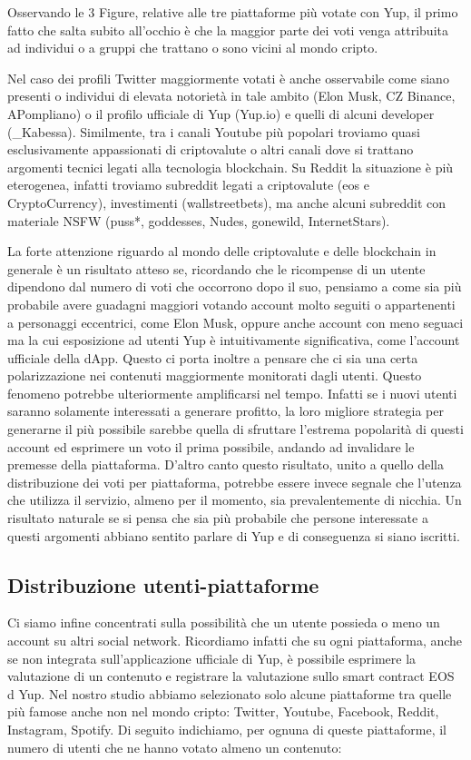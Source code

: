 Osservando le 3 Figure, relative alle tre piattaforme più votate con Yup, il primo fatto che salta subito all'occhio è che la maggior parte dei voti venga attribuita ad individui o a gruppi che trattano o sono vicini al mondo cripto. 


Nel caso dei profili Twitter maggiormente votati è anche osservabile come siano presenti o individui di elevata notorietà in tale ambito (Elon Musk, CZ Binance, APompliano) o il profilo ufficiale di Yup (Yup.io) e quelli di alcuni developer (\_Kabessa).
Similmente, tra i canali Youtube più popolari troviamo quasi esclusivamente appassionati di criptovalute o altri canali dove si trattano argomenti tecnici legati alla tecnologia blockchain.
Su Reddit la situazione è più eterogenea, infatti troviamo subreddit legati a criptovalute (eos e CryptoCurrency), investimenti (wallstreetbets), ma anche alcuni subreddit con materiale NSFW (puss*, goddesses, Nudes, gonewild, InternetStars).

La forte attenzione riguardo al mondo delle criptovalute e delle blockchain in generale è un risultato atteso se, ricordando che le ricompense di un utente dipendono dal numero di voti che occorrono dopo il suo, pensiamo a come sia più probabile avere guadagni maggiori votando account molto seguiti o appartenenti a personaggi eccentrici, come Elon Musk, oppure anche account con meno seguaci ma la cui esposizione ad utenti Yup è intuitivamente significativa, come l'account ufficiale della dApp.
Questo ci porta inoltre a pensare che ci sia una certa polarizzazione nei contenuti maggiormente monitorati dagli utenti.
Questo fenomeno potrebbe ulteriormente amplificarsi nel tempo.
Infatti se i nuovi utenti saranno solamente interessati a generare profitto, la loro migliore strategia per generarne il più possibile sarebbe quella di sfruttare l'estrema popolarità di questi account ed esprimere un voto il prima possibile, andando ad invalidare le premesse della piattaforma.
D'altro canto questo risultato, unito a quello della distribuzione dei voti per piattaforma, potrebbe essere invece segnale che l'utenza che utilizza il servizio, almeno per il momento, sia prevalentemente di nicchia.
Un risultato naturale se si pensa che sia più probabile che persone interessate a questi argomenti abbiano sentito parlare di Yup e di conseguenza si siano iscritti. 


\subsection{Distribuzione utenti-piattaforme}
Ci siamo infine concentrati sulla possibilità che un utente possieda o meno un account su altri social network. Ricordiamo infatti che su ogni piattaforma, anche se non integrata sull'applicazione ufficiale di Yup, è possibile esprimere la valutazione di un contenuto e registrare la valutazione sullo smart contract EOS d Yup. Nel nostro studio abbiamo selezionato solo alcune piattaforme tra quelle più famose anche non nel mondo cripto: Twitter, Youtube, Facebook, Reddit, Instagram, Spotify. Di seguito indichiamo, per ognuna di queste piattaforme, il numero di utenti che ne hanno votato almeno un contenuto:

